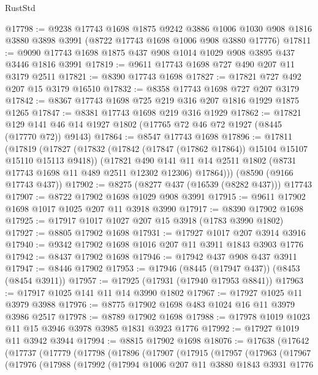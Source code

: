 \begin{lexlean}{RustStd}
\begin{coremodule}
@17798 := @9238
    @17743
    @1698
    @1875
    @9242
    @3886
    @1006
    @1030
    @908
    @1816
    @3880
    @3898
    @3991
    (@8722 @17743 @1698 @1006 @908 @3880 @17776)
@17811 := @9090 @17743 @1698 @1875 @437 @908 @1014 @1029 @908 @3895 @437 @3446 @1816 @3991
@17819 := @9611 @17743 @1698 @727 @490 @207 @11 @3179 @2511
@17821 := @8390 @17743 @1698
@17827 := @17821 @727 @492 @207 @15 @3179 @16510
@17832 := @8358 @17743 @1698 @727 @207 @3179
@17842 := @8367 @17743 @1698 @725 @219 @316 @207 @1816 @1929 @1875 @1265
@17847 := @8381 @17743 @1698 @219 @316 @1929
@17862 := @17821 @129 @141 @46 @14 @1927 @1802 (@17765 @72 @46 @72 @1927 (@8445 (@17770 @72)) @9143)
@17864 := @8547 @17743 @1698
@17896 := @17811
    (@17819
      (@17827
        (@17832 (@17842 (@17847 (@17862 @17864)) @15104 @15107 @15110 @15113 @9418))
        (@17821
          @490
          @141
          @11
          @14
          @2511
          @1802
          (@8731 @17743 @1698 @11 @489 @2511 @12302 @12306)
          @17864)))
    (@8590 (@9166 @17743 @437))
@17902 := @8275 (@8277 @437 (@16539 (@8282 @437))) @17743
@17907 := @8722 @17902 @1698 @1029 @908 @3991
@17915 := @9611 @17902 @1698 @1017 @1025 @207 @11 @3918 @3990
@17917 := @8390 @17902 @1698
@17925 := @17917 @1017 @1027 @207 @15 @3918 (@1783 @3990 @1802)
@17927 := @8805 @17902 @1698
@17931 := @17927 @1017 @207 @3914 @3916
@17940 := @9342 @17902 @1698 @1016 @207 @11 @3911 @1843 @3903 @1776
@17942 := @8437 @17902 @1698
@17946 := @17942 @437 @908 @437 @3911
@17947 := @8446 @17902
@17953 := @17946 (@8445 (@17947 @437)) (@8453 (@8454 @3911))
@17957 := @17925 (@17931 (@17940 @17953 @8841))
@17963 := @17917 @1025 @141 @11 @14 @3990 @1802
@17967 := @17927 @1025 @11 @3979 @3988
@17976 := @8775 @17902 @1698 @483 @1024 @16 @11 @3979 @3986 @2517
@17978 := @8789 @17902 @1698
@17988 := @17978 @1019 @1023 @11 @15 @3946 @3978 @3985 @1831 @3923 @1776
@17992 := @17927 @1019 @11 @3942 @3944
@17994 := @8815 @17902 @1698
@18076 := @17638
    (@17642
      (@17737
        (@17779
          (@17798
            (@17896
              (@17907
                (@17915
                  (@17957
                    (@17963
                      (@17967
                        (@17976
                          (@17988
                            (@17992
                              (@17994
                                @1006
                                @207
                                @11
                                @3880
                                @1843
                                @3931
                                @1776

\end{coremodule}
\end{lexlean}
